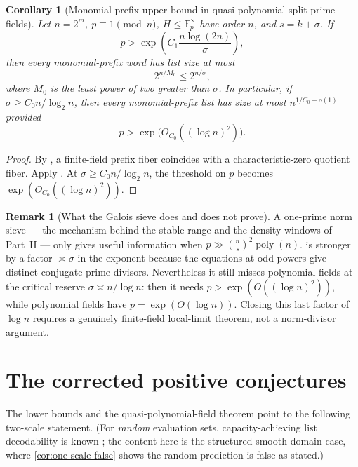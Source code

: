 \documentclass[11pt]{article}
\newtheorem{corollary}[corollary]{Corollary}
\theoremstyle{definition}
\newtheorem{remark}[remark]{Remark}
\newcommand{\F}{\mathbb F}
\begin{document}
\begin{corollary}[Monomial-prefix upper bound in quasi-polynomial split prime fields]\label{cor:quasipoly-upper}
Let $n=2^m$, $p\equiv1\pmod n$, $H\le\F_p^\times$ have order $n$, and $s=k+\sigma$.  If
\[
        p>\exp\!\left(C_1\frac{n\log(2n)}{\sigma}\right),
\]
then every monomial-prefix word has list size at most
\[
        2^{n/M_0}\le 2^{n/\sigma},
\]
where $M_0$ is the least power of two greater than $\sigma$.  In particular, if $\sigma\ge C_0n/\log_2n$, then every monomial-prefix list has size at most $n^{1/C_0+o(1)}$ provided
\[
        p>\exp\big(O_{C_0}((\log n)^2)\big).
\]
\end{corollary}

\begin{proof}
By , a finite-field prefix fiber coincides with a characteristic-zero quotient fiber.  Apply .  At $\sigma\ge C_0n/\log_2n$, the threshold on $p$ becomes $\exp(O_{C_0}((\log n)^2))$.
\end{proof}

\begin{remark}[What the Galois sieve does and does not prove]\label{rem:galois-limit}
A one-prime norm sieve --- the mechanism behind the stable range and the density windows of Part~II --- only gives useful information when $p\gg\binom ns^2\operatorname{poly}(n)$.   is stronger by a factor $\asymp\sigma$ in the exponent because the equations at odd powers give distinct conjugate prime divisors.  Nevertheless it still misses polynomial fields at the critical reserve $\sigma\asymp n/\log n$: then it needs $p>\exp(O((\log n)^2))$, while polynomial fields have $p=\exp(O(\log n))$.  Closing this last factor of $\log n$ requires a genuinely finite-field local-limit theorem, not a norm-divisor argument.
\end{remark}

\section{The corrected positive conjectures}\label{sec:conjectures}

The lower bounds and the quasi-polynomial-field theorem point to the following two-scale statement.  (For \emph{random} evaluation sets, capacity-achieving list decodability is known \cite{BGM23,GZ23}; the content here is the structured smooth-domain case, where \cref{cor:one-scale-false} shows the random prediction is false as stated.)
\end{document}
